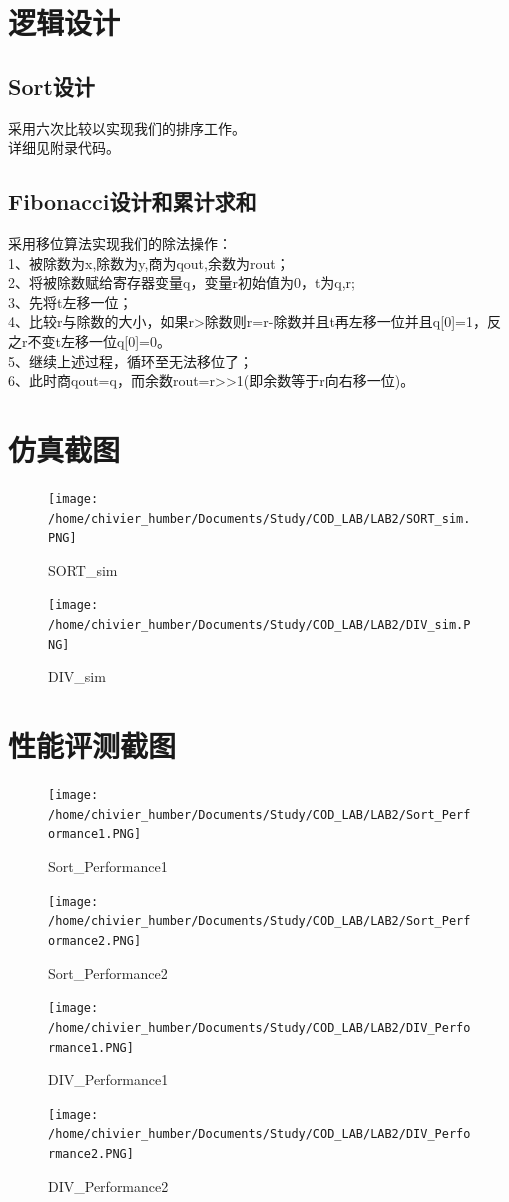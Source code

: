 \documentclass[12pt, a4paper]{article}
\begin{document}
\section{逻辑设计}
\subsection{Sort设计}
采用六次比较以实现我们的排序工作。\\
详细见附录代码。
\subsection{Fibonacci设计和累计求和}
采用移位算法实现我们的除法操作：\\
1、被除数为x,除数为y,商为qout,余数为rout；\\
2、将被除数赋给寄存器变量q，变量r初始值为0，t为{q,r};\\
3、先将t左移一位；\\
4、比较r与除数的大小，如果r>除数则r=r-除数并且t再左移一位并且q[0]=1，反之r不变t左移一位q[0]=0。\\
5、继续上述过程，循环至无法移位了；\\
6、此时商qout=q，而余数rout=r>>1(即余数等于r向右移一位)。\\
\clearpage

\section{仿真截图}
\begin{figure}[H]
	\centering
	\texttt{[image: /home/chivier\_humber/Documents/Study/COD\_LAB/LAB2/SORT\_sim.PNG]}
	\caption{SORT\_sim}
\end{figure}
\begin{figure}[H]
\centering
\texttt{[image: /home/chivier\_humber/Documents/Study/COD\_LAB/LAB2/DIV\_sim.PNG]}
\caption{DIV\_sim}
\end{figure}
\clearpage

\section{性能评测截图}
\begin{figure}[H]
	\centering
	\texttt{[image: /home/chivier\_humber/Documents/Study/COD\_LAB/LAB2/Sort\_Performance1.PNG]}
	\caption{Sort\_Performance1}
\end{figure}
\begin{figure}[H]
	\centering
	\texttt{[image: /home/chivier\_humber/Documents/Study/COD\_LAB/LAB2/Sort\_Performance2.PNG]}
	\caption{Sort\_Performance2}
\end{figure}
\begin{figure}[H]
	\centering
	\texttt{[image: /home/chivier\_humber/Documents/Study/COD\_LAB/LAB2/DIV\_Performance1.PNG]}
	\caption{DIV\_Performance1}
\end{figure}
\begin{figure}[H]
	\centering
	\texttt{[image: /home/chivier\_humber/Documents/Study/COD\_LAB/LAB2/DIV\_Performance2.PNG]}
	\caption{DIV\_Performance2}
\end{figure}
\clearpage
\end{document}
